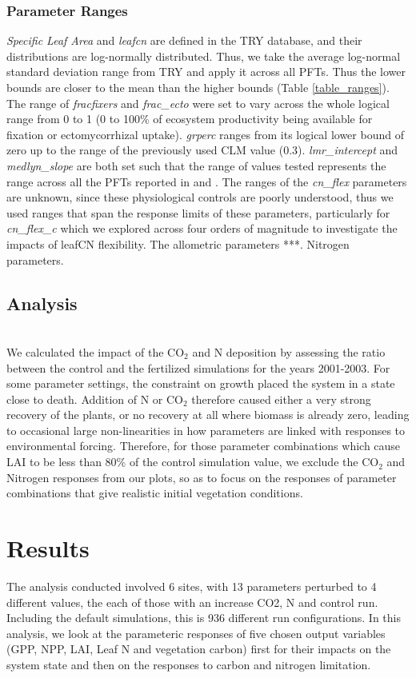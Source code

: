\documentclass[draft,linenumbers]{agujournal}
\begin{document}
\subsubsection{Parameter Ranges}

\emph{Specific Leaf Area} and \emph{leafcn} are defined in the TRY database, and their distributions are log-normally distributed. Thus, we take the average log-normal standard deviation range from TRY and apply it across all PFTs. Thus the lower bounds are closer to the mean than the higher bounds (Table \ref{table_ranges}). The range of \emph{fracfixers} and \emph{frac\_ecto} were set to vary across the whole logical range from 0 to 1 (0 to 100\% of ecosystem productivity being available for fixation or ectomycorrhizal uptake). \emph{grperc} ranges from its logical lower bound of zero up to the range of the previously used CLM value (0.3). \emph{lmr\_intercept} and \emph{medlyn\_slope} are both set such that the range of values tested represents the range across all the PFTs reported in \cite{atkin2015} and \cite{dekauwe2015}. The ranges of the \emph{cn\_flex} parameters are unknown, since these physiological controls are poorly understood, thus we used ranges that span the response limits of these parameters, particularly for \emph{cn\_flex\_c} which we explored across four orders of magnitude to investigate the impacts of leafCN flexibility. The allometric parameters ***. Nitrogen parameters.


\subsection{Analysis}\\
We calculated the impact of the CO$_{2}$ and N deposition by assessing the ratio between the control and the fertilized simulations for the years 2001-2003. For some parameter settings, the constraint on growth placed the system in a state close to death. Addition of N or CO$_{2}$ therefore caused either a very strong recovery of the plants, or no recovery at all where biomass is already zero, leading to occasional large non-linearities in how parameters are linked with responses to environmental forcing. Therefore, for those parameter combinations which cause LAI to be less than 80\% of the control simulation value, we exclude the CO$_{2}$ and Nitrogen responses from our plots, so as to focus on the responses of parameter combinations that give realistic initial vegetation conditions.


\section{Results}
The analysis conducted involved 6 sites, with 13 parameters perturbed to 4 different values, the each of those with an increase CO2, N and control run. Including the default simulations, this is 936 different run configurations. In this analysis, we look at the parameteric responses of five chosen output variables (GPP, NPP, LAI, Leaf N and vegetation carbon) first for their impacts on the system state and then on the responses to carbon and nitrogen limitation. 
\end{document}
